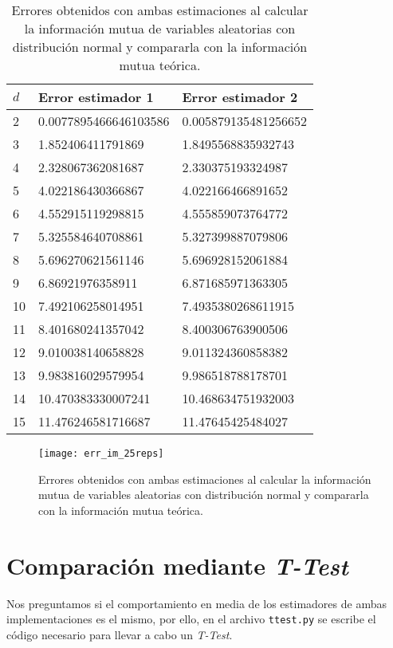 \documentclass[12pt,a4paper]{report} %
\theoremstyle{definition}
\begin{document}
\begin{table}[H]
\centering
\caption{Errores obtenidos con ambas estimaciones al calcular la información mutua de variables aleatorias con distribución normal y compararla con la información mutua teórica.}
\label{tab:err_im}
\begin{tabular}{lll}
\toprule
$d$ & Error estimador 1 & Error estimador 2\\ \midrule
2 & 0.0077895466646103586 & 0.005879135481256652\\
3 & 1.852406411791869 & 1.8495568835932743\\
4 & 2.328067362081687 & 2.330375193324987\\
5 & 4.022186430366867 & 4.022166466891652\\
6 & 4.552915119298815 & 4.555859073764772\\
7 & 5.325584640708861 & 5.327399887079806\\
8 & 5.696270621561146 & 5.696928152061884\\
9 & 6.86921976358911 & 6.871685971363305\\
10 & 7.492106258014951 & 7.4935380268611915\\
11 & 8.401680241357042 & 8.400306763900506\\
12 & 9.010038140658828 & 9.011324360858382\\
13 & 9.983816029579954 & 9.986518788178701\\
14 & 10.470383330007241 & 10.468634751932003\\
15 & 11.476246581716687 & 11.47645425484027\\
\bottomrule
\end{tabular}
\end{table}

\begin{figure}[H]
    \centering
    \texttt{[image: err\_im\_25reps]}
    \caption{Errores obtenidos con ambas estimaciones al calcular la información mutua de variables aleatorias con distribución normal y compararla con la información mutua teórica.}
    \label{fig:err_im}
\end{figure}

\section{Comparación mediante \textit{T-Test}}

Nos preguntamos si el comportamiento en media de los estimadores de ambas implementaciones es el mismo, por ello, en el archivo \texttt{ttest.py} se escribe el código necesario para llevar a cabo un \textit{T-Test}.\\
\end{document}
